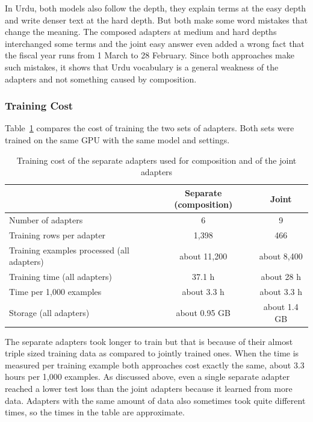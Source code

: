 \documentclass{FastFyp}
\begin{document}
In Urdu, both models also follow the depth, they explain terms at the easy depth and write denser text at the hard depth. But both make some word mistakes that change the meaning. The composed adapters at medium and hard depths interchanged some terms and the joint easy answer even added a wrong fact that the fiscal year runs from 1 March to 28 February. Since both approaches make such mistakes, it shows that Urdu vocabulary is a general weakness of the adapters and not something caused by composition.


\subsubsection{Training Cost}
Table~\ref{tab:comp-cost} compares the cost of training the two sets of adapters. Both sets were trained on the same GPU with the same model and settings.

\begin{table}[H]
\centering
\caption{Training cost of the separate adapters used for composition and of the joint adapters}
\label{tab:comp-cost}
\small
\begin{tabular}{|l|c|c|}
\hline
 & \textbf{Separate (composition)} & \textbf{Joint} \\ \hline
Number of adapters & 6 & 9 \\ \hline
Training rows per adapter & 1,398 & 466 \\ \hline
Training examples processed (all adapters) & about 11,200 & about 8,400 \\ \hline
Training time (all adapters) & 37.1 h & about 28 h \\ \hline
Time per 1,000 examples & about 3.3 h & about 3.3 h \\ \hline
Storage (all adapters) & about 0.95 GB & about 1.4 GB \\ \hline
\end{tabular}
\end{table}

The separate adapters took longer to train but that is because of their almost triple sized training data as compared to jointly trained ones. When the time is measured per training example both approaches cost exactly the same, about 3.3 hours per 1,000 examples. As discussed above, even a single separate adapter reached a lower test loss than the joint adapters because it learned from more data. Adapters with the same amount of data also sometimes took quite different times, so the times in the table are approximate.
\end{document}
